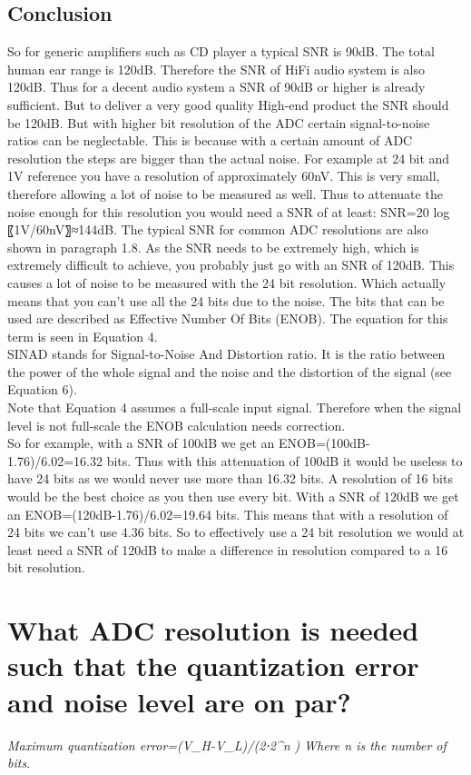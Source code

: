 \subsection{Conclusion}
So for generic amplifiers such as CD player a typical SNR is 90dB. The total human ear range is 120dB. Therefore the SNR of HiFi audio system is also 120dB. Thus for a decent audio system a SNR of 90dB or higher is already sufficient. But to deliver a very good quality High-end product the SNR should be 120dB. 
But with higher bit resolution of the ADC certain signal-to-noise ratios can be neglectable. This is because with a certain amount of ADC resolution the steps are bigger than the actual noise. For example at 24 bit and 1V reference you have a resolution of approximately 60nV. This is very small, therefore allowing a lot of noise to be measured as well. Thus to attenuate the noise enough for this resolution you would need a SNR of at least: SNR=20 log⁡〖1V/60nV〗≈144dB. The typical SNR for common ADC resolutions are also shown in paragraph 1.8. 
As the SNR needs to be extremely high, which is extremely difficult to achieve, you probably just go with an SNR of 120dB. This causes a lot of noise to be measured with the 24 bit resolution. Which actually means that you can’t use all the 24 bits due to the noise. The bits that can be used are described as Effective Number Of Bits (ENOB). The equation for this term is seen in Equation 4.\\
SINAD stands for Signal-to-Noise And Distortion ratio. It is the ratio between the power of the whole signal and the noise and the distortion of the signal (see Equation 6). \\
Note that Equation 4 assumes a full-scale input signal. Therefore when the signal level is not full-scale the ENOB calculation needs correction. \\
So for example, with a SNR of 100dB we get an ENOB=(100dB-1.76)/6.02=16.32 bits. Thus with this attenuation of 100dB it would be useless to have 24 bits as we would never use more than 16.32 bits. A resolution of 16 bits would be the best choice as you then use every bit.
With a SNR of 120dB we get an ENOB=(120dB-1.76)/6.02=19.64 bits. This means that with a resolution of 24 bits we can’t use 4.36 bits. 
So to effectively use a 24 bit resolution we would at least need a SNR of 120dB to make a difference in resolution compared to a 16 bit resolution.\\

\section{What ADC resolution is needed such that the quantization error and noise level are on par?}
\textit{Maximum quantization error=(V_H-V_L)/(2⋅2^n )}
\textit{Where n is the number of bits.}\\

